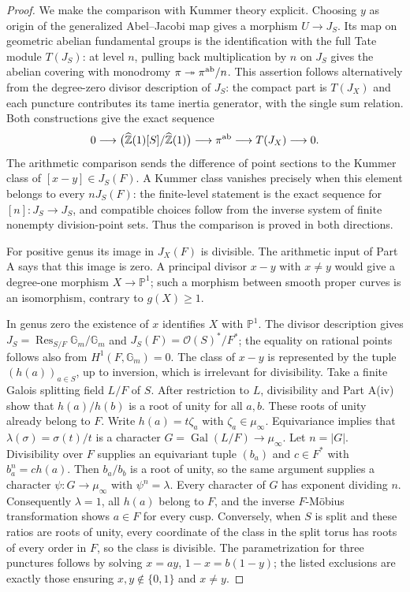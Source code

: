 \begin{proof}
We make the comparison with Kummer theory explicit.  Choosing $y$ as origin
of the generalized Abel--Jacobi map gives a morphism $U\to J_S$.  Its map on
geometric abelian fundamental groups is the identification with the full
Tate module $T(J_S)$: at level $n$, pulling back multiplication by $n$ on
$J_S$ gives the abelian covering with monodromy
$\pi\twoheadrightarrow\pi^{\rm ab}/n$.  This assertion follows alternatively
from the degree-zero divisor description of $J_S$: the compact part is
$T(J_X)$ and each puncture contributes its tame inertia generator, with the
single sum relation.  Both constructions give the exact sequence
\[
 0\longrightarrow
 \bigl(\widehat{\mathbb Z}(1)[S]/\widehat{\mathbb Z}(1)\bigr)
 \longrightarrow \pi^{\rm ab}\longrightarrow T(J_X)\longrightarrow0.
\]
The arithmetic comparison sends the difference of point sections to the
Kummer class of $[x-y]\in J_S(F)$.  A Kummer class vanishes precisely when
this element belongs to every $nJ_S(F)$: the finite-level statement is the
exact sequence for $[n]:J_S\to J_S$, and compatible choices follow from the
inverse system of finite nonempty division-point sets.  Thus the comparison
is proved in both directions.

For positive genus its image in $J_X(F)$ is divisible.  The arithmetic
input of Part A says that this image is zero.  A principal divisor $x-y$
with $x\ne y$ would give a degree-one morphism $X\to\mathbb P^1$; such a
morphism between smooth proper curves is an isomorphism, contrary to
$g(X)\geq1$.

In genus zero the existence of $x$ identifies $X$ with $\mathbb P^1$.
The divisor description gives
$J_S=\operatorname{Res}_{S/F}\mathbb G_m/\mathbb G_m$ and
$J_S(F)=\mathcal O(S)^*/F^*$; the equality on rational points follows also
from $H^1(F,\mathbb G_m)=0$.  The class of $x-y$ is represented by the tuple
$(h(a))_{a\in S}$, up to inversion, which is irrelevant for divisibility.
Take a finite Galois splitting field $L/F$ of $S$.  After restriction to $L$,
divisibility and Part A(iv) show that $h(a)/h(b)$ is a root of unity for
all $a,b$.  These roots of unity already belong to $F$.  Write
$h(a)=t\zeta_a$ with $\zeta_a\in\mu_\infty$.  Equivariance implies that
$\lambda(\sigma)=\sigma(t)/t$ is a character
$G=\operatorname{Gal}(L/F)\to\mu_\infty$.
Let $n=|G|$.  Divisibility over $F$ supplies an equivariant tuple $(b_a)$
and $c\in F^*$ with $b_a^n=c h(a)$.  Then $b_a/b_b$ is a root of unity,
so the same argument supplies a character $\psi:G\to\mu_\infty$ with
$\psi^n=\lambda$.  Every character of $G$ has exponent dividing $n$.
Consequently $\lambda=1$, all $h(a)$ belong to $F$, and the inverse
$F$-M\"obius transformation shows $a\in F$ for every cusp.  Conversely,
when $S$ is split and these ratios are roots of unity, every coordinate of
the class in the split torus has roots of every order in $F$, so the class
is divisible.  The parametrization for three punctures follows by solving
$x=ay$, $1-x=b(1-y)$; the listed exclusions are exactly those ensuring
$x,y\notin\{0,1\}$ and $x\ne y$.
\end{proof}

